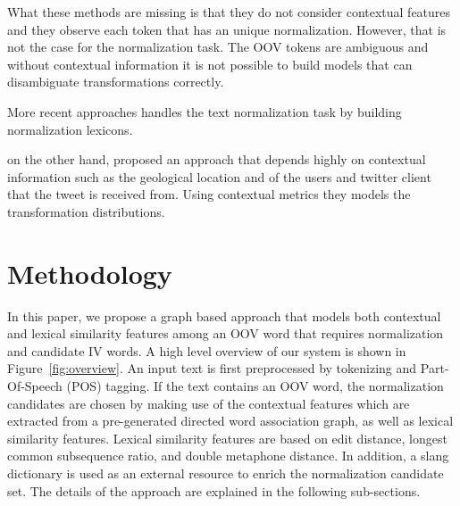 \documentclass[preprint,review,12pt]{elsarticle}
\begin{document}
What these methods are missing is that they do not consider contextual features and they observe each token that has an unique normalization. However, that is not the case for the normalization task. The OOV tokens are ambiguous and without contextual information it is not possible to build models that can disambiguate transformations correctly.

More recent approaches handles the text normalization task by building normalization lexicons.
\cite{Han:2011:LNS:2002472.2002520}

\cite{DBLP:conf/acl/HassanM13}

\cite{Gouws:2011:CBL:2021109.2021113} on the other hand, proposed an approach that depends highly on contextual information such as the geological location and of the users and twitter client that the tweet is received from. Using contextual metrics they models the transformation distributions.

\section{Methodology}
\label{sec:method}



In this paper, we propose a graph based approach that models both contextual and lexical similarity features among an OOV word that requires normalization and candidate IV words. A high level overview of our system is shown in Figure~\ref{fig:overview}. An input text is first preprocessed by tokenizing and Part-Of-Speech (POS) tagging. If the text contains an OOV word, the normalization candidates are chosen by making use of the contextual features which are extracted from a pre-generated directed word association graph, as well as lexical similarity features. Lexical similarity features are based on edit distance, longest common subsequence ratio, and double metaphone distance. In addition, a slang dictionary is used as an external resource to enrich the normalization candidate set. The details of the approach are explained in the following sub-sections.
\end{document}
